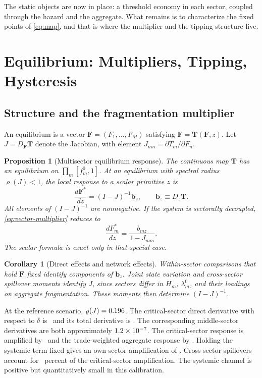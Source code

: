 \documentclass[11pt]{article}
\newtheorem{proposition}{Proposition}
\newtheorem{corollary}{Corollary}
\theoremstyle{definition}
\begin{document}
The static objects are now in place: a threshold economy in each sector, coupled through the hazard and the aggregate. What remains is to characterize the fixed points of \eqref{eq:map}, and that is where the multiplier and the tipping structure live.

\section{Equilibrium: Multipliers, Tipping, Hysteresis}\label{sec:equilibrium}

\subsection{Structure and the fragmentation multiplier}

An equilibrium is a vector $\mathbf F=(F_1,\ldots,F_M)$ satisfying $\mathbf F=\mathbf T(\mathbf F,z)$. Let $J=D_{\mathbf F}\mathbf T$ denote the Jacobian, with element $J_{mn}=\partial T_m/\partial F_n$.

\begin{proposition}[Multisector equilibrium response]\label{prop:multiplier}
The continuous map $\mathbf T$ has an equilibrium on $\prod_m[f_m^0,1]$. At an equilibrium with spectral radius $\varrho(J)<1$, the local response to a scalar primitive $z$ is
\begin{equation}
\frac{d\mathbf F^*}{dz}=(I-J)^{-1}\mathbf b_z,
\qquad
\mathbf b_z\equiv D_z\mathbf T.
\label{eq:vector-multiplier}
\end{equation}
All elements of $(I-J)^{-1}$ are nonnegative. If the system is sectorally decoupled, \eqref{eq:vector-multiplier} reduces to
\[
\frac{dF_m^*}{dz}=\frac{b_{mz}}{1-J_{mm}}.
\]
The scalar formula is exact only in that special case.
\end{proposition}

\begin{corollary}[Direct effects and network effects]\label{cor:micromacro}
Within-sector comparisons that hold $\mathbf F$ fixed identify components of $\mathbf b_z$. Joint state variation and cross-sector spillover moments identify $J$, since sectors differ in $H_m$, $\lambda_m^0$, and their loadings on aggregate fragmentation. These moments then determine $(I-J)^{-1}$.
\end{corollary}

At the reference scenario, $\varrho(J)=0.196$. The critical-sector direct derivative with respect to $\delta$ is \DirectCritResponse\ and its total derivative is \TotalCritResponse. The corresponding middle-sector derivatives are both approximately $1.2\times10^{-7}$. The critical-sector response is amplified by \MCrit\ and the trade-weighted aggregate response by \MAgg. Holding the systemic term fixed gives an own-sector amplification of \MOwnCrit. Cross-sector spillovers account for \CrossAmplificationSharePct\ percent of the critical-sector amplification. The systemic channel is positive but quantitatively small in this calibration.
\end{document}
